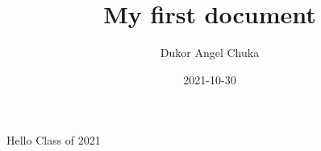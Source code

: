\documentclass{article}
\title{My first document}
\date{2021-10-30}
\author{Dukor Angel Chuka}
\begin{document}
	\maketitle
	\newpage
	Hello Class of 2021
\end{document}

